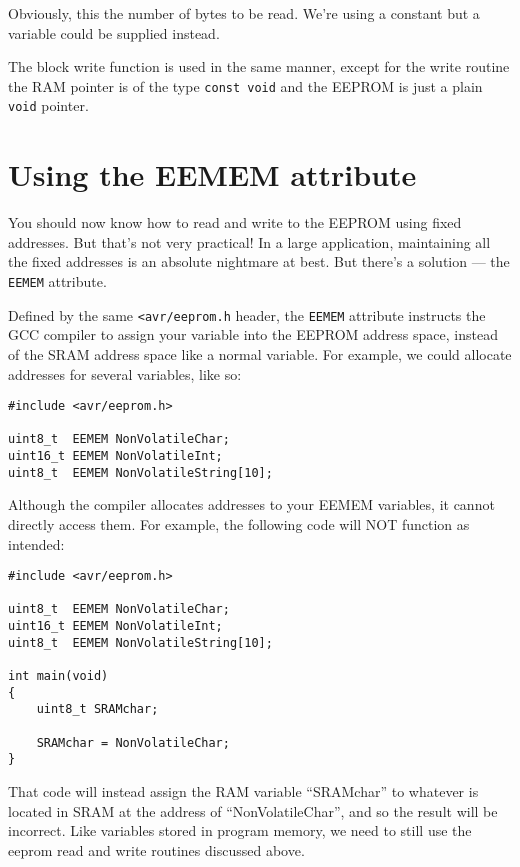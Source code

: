 \documentclass[a4paper,oneside,notitlepage]{book}
\begin{document}
Obviously, this the number of bytes to be read. We're using a constant but a variable could be supplied instead.

The block write function is used in the same manner, except for the write routine the RAM pointer is of the type \lstinline{const void} and the EEPROM is just a plain \lstinline{void} pointer.

\chapter{Using the EEMEM attribute}

You should now know how to read and write to the EEPROM using fixed addresses. But that's not very practical! In a large application, maintaining all the fixed addresses is an absolute nightmare at best. But there's a solution --- the \lstinline{EEMEM} attribute.

Defined by the same \lstinline{<avr/eeprom.h} header, the \lstinline{EEMEM} attribute instructs the GCC compiler to assign your variable into the EEPROM address space, instead of the SRAM address space like a normal variable. For example, we could allocate addresses for several variables, like so:

\begin{center}
\begin{lstlisting}
#include <avr/eeprom.h>

uint8_t  EEMEM NonVolatileChar;
uint16_t EEMEM NonVolatileInt;
uint8_t  EEMEM NonVolatileString[10];
\end{lstlisting}
\end{center}

Although the compiler allocates addresses to your EEMEM variables, it cannot directly access them. For example, the following code will NOT function as intended:

\begin{center}
\begin{lstlisting}
#include <avr/eeprom.h>

uint8_t  EEMEM NonVolatileChar;
uint16_t EEMEM NonVolatileInt;
uint8_t  EEMEM NonVolatileString[10];

int main(void)
{
    uint8_t SRAMchar;

    SRAMchar = NonVolatileChar;
}
\end{lstlisting}
\end{center}

That code will instead assign the RAM variable ``SRAMchar'' to whatever is located in SRAM at the address of ``NonVolatileChar'', and so the result will be incorrect. Like variables stored in program memory, we need to still use the eeprom read and write routines discussed above.
\end{document}
